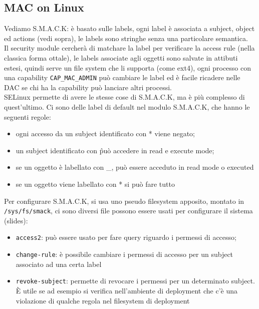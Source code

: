\documentclass[12pt, oneside]{extbook} %
\begin{document}
\subsection{MAC on Linux}
Vediamo S.M.A.C.K: è basato sulle labels, ogni label è associata a subject, object ed actions (vedi sopra), le labels sono stringhe senza una particolare semantica.\\Il security module cercherà di matchare la label per verificare la access rule (nella classica forma ottale), le labels associate agli oggetti sono salvate in attibuti estesi, quindi serve un file system che li supporta (come ext4), ogni processo con una capability \texttt{CAP\_MAC\_ADMIN} può cambiare le label ed è facile ricadere nelle DAC se chi ha la capability può lanciare altri processi.\\SELinux permette di avere le stesse cose di S.M.A.C.K, ma è più complesso di quest'ultimo. Ci sono delle label di default nel modulo S.M.A.C.K, che hanno le seguenti regole:
\begin{itemize}
\item ogni accesso da un subject identificato con * viene negato;
\item un subject identificato con \^ può accedere in read e execute mode;
\item se un oggetto è labellato con \_, può essere acceduto in read mode o executed
\item se un oggetto viene labellato con * si può fare tutto
\end{itemize}
Per configurare S.M.A.C.K, si usa uno pseudo filesystem apposito, montato in \texttt{/sys/fs/smack}, ci sono diversi file  possono essere usati per configurare il sistema (slides):
\begin{itemize}
\item \texttt{access2}: può essere usato per fare query riguardo i permessi di accesso;
\item \texttt{change-rule}: è possibile cambiare i permessi di accesso per un subject associato ad una certa label
\item \texttt{revoke-subject}: permette di revocare i permessi per un determinato subject. È utile se ad esempio si verifica nell'ambiente di deployment che c'è una violazione di qualche regola nel filesystem di deployment
\end{itemize}
\end{document}
